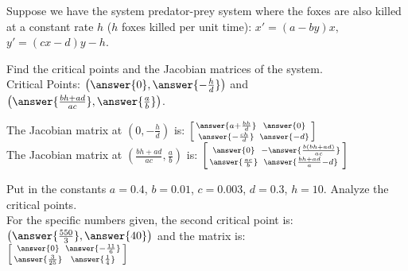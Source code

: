 \documentclass{ximera}
\begin{document}
\begin{exercise}%
    Suppose we have the system predator-prey system where the foxes are also killed at a constant rate $h$ ($h$ foxes killed per unit time): $x' = (a-by)x,$  $y' = (cx-d)y - h$.
    
    Find the critical points and the Jacobian matrices of the system.\\
    Critical Points: $\left(\answer{0}, \answer{-\frac{h}{d}}\right)$ and $\left(\answer{\frac{bh+ad}{ac}}, \answer{\frac{a}{b}}\right)$.\\
    \begin{problem}
        The Jacobian matrix at $(0,-\frac{h}{d})$ is:
            $\left[
            \begin{smallmatrix}
                \answer{a + \frac{bh}{d}} & \answer{0} \\
                \answer{-\frac{ch}{d}} & \answer{-d}
            \end{smallmatrix}
            \right]$\\
        The Jacobian matrix at $(\frac{bh+ad}{ac},\frac{a}{b})$ is:
            $\left[
            \begin{smallmatrix}
                \answer{0} & -\answer{\frac{b \left( b h+a d\right) }{a c}}\\
                \answer{\frac{a c}{b}} & \answer{\frac{b h+a d}{a}-d}
            \end{smallmatrix}
            \right]$
        \begin{problem} 
            Put in the constants $a=0.4$, $b=0.01$, $c=0.003$, $d=0.3$, $h=10$. Analyze the critical points.  \\%
            For the specific numbers given, the second critical point is: $\left(\answer{\frac{550}{3}}, \answer{40}\right)$ and the matrix is:\\
            $\left[ \begin{smallmatrix}
                \answer{0} & \answer{-\frac{11}{6}} \\
                \answer{\frac{3}{25}} & \answer{\frac{1}{4}}
            \end{smallmatrix} \right]$
        \end{problem}
    \end{problem}
\end{exercise}
\end{document}
